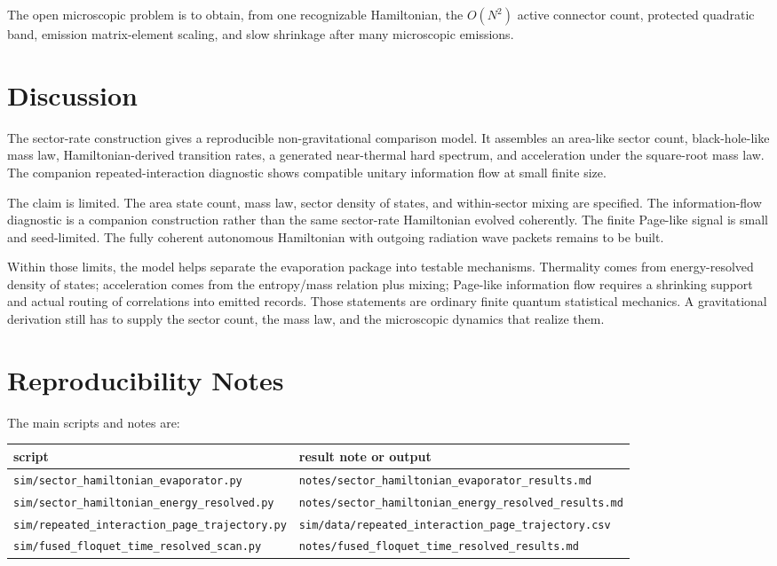 \documentclass[aps,prd,onecolumn,longbibliography,nofootinbib]{revtex4-2}
\begin{document}
The open microscopic problem is to obtain, from one recognizable Hamiltonian,
the $O(N^2)$ active connector count, protected quadratic band, emission
matrix-element scaling, and slow shrinkage after many microscopic emissions.

\section{Discussion}

The sector-rate construction gives a reproducible non-gravitational comparison
model.  It assembles an area-like sector count, black-hole-like mass law,
Hamiltonian-derived transition rates, a generated near-thermal hard spectrum,
and acceleration under the square-root mass law.  The companion
repeated-interaction diagnostic shows compatible unitary information flow at
small finite size.

The claim is limited.  The area state count, mass law, sector density of states,
and within-sector mixing are specified.  The information-flow diagnostic is a
companion construction rather than the same sector-rate Hamiltonian evolved
coherently.  The finite Page-like signal is small and seed-limited.  The
fully coherent autonomous Hamiltonian with outgoing radiation wave packets
remains to be built.

Within those limits, the model helps separate the evaporation package into
testable mechanisms.  Thermality comes from energy-resolved density of states;
acceleration comes from the entropy/mass relation plus mixing; Page-like
information flow requires a shrinking support and actual routing of
correlations into emitted records.  Those statements are ordinary finite
quantum statistical mechanics.  A gravitational derivation still has to supply
the sector count, the mass law, and the microscopic dynamics that realize them.

\appendix

\section{Reproducibility Notes}

The main scripts and notes are:
\begin{center}
\begin{tabular}{ll}
\toprule
script & result note or output\\
\midrule
\texttt{sim/sector\_hamiltonian\_evaporator.py} &
\texttt{notes/sector\_hamiltonian\_evaporator\_results.md}\\
\texttt{sim/sector\_hamiltonian\_energy\_resolved.py} &
\texttt{notes/sector\_hamiltonian\_energy\_resolved\_results.md}\\
\texttt{sim/repeated\_interaction\_page\_trajectory.py} &
\texttt{sim/data/repeated\_interaction\_page\_trajectory.csv}\\
\texttt{sim/fused\_floquet\_time\_resolved\_scan.py} &
\texttt{notes/fused\_floquet\_time\_resolved\_results.md}\\
\bottomrule
\end{tabular}
\end{center}
\end{document}
